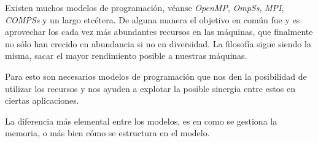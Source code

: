 Existen muchos modelos de programación, véanse \textit{OpenMP}\cite{dagum1998openmp}, \textit{OmpSs}\cite{duran2011ompss}, \textit{MPI}\cite{walker1996mpi}, \textit{COMPSs}\cite{badia2015comp} y un largo etcétera. De alguna manera el objetivo en común fue y es aprovechar los cada vez más abundantes recursos en las máquinas, que finalmente no sólo han crecido en abundancia si no en diversidad. La filosofía sigue siendo la misma, sacar el mayor rendimiento posible a nuestras máquinas. 
\par\bigskip

Para esto son necesarios modelos de programación que nos den la posibilidad de utilizar los recursos y nos ayuden a explotar la posible sinergia entre estos en ciertas aplicaciones. 
\par\bigskip

La diferencia más elemental entre los modelos, es en como se gestiona la memoria, o más bien cómo se estructura en el modelo.

